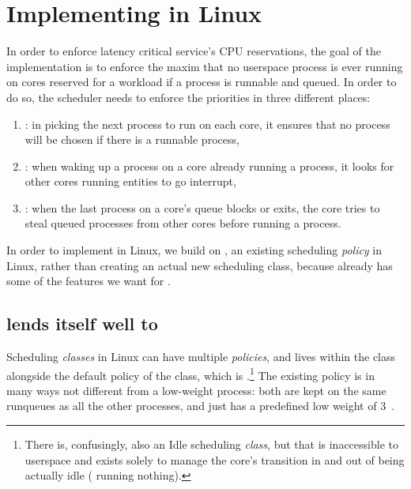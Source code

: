 \section{Implementing \beclass{} in Linux}\label{s:implementation}

In order to enforce latency critical service's CPU reservations, the goal of the
implementation is to enforce the maxim that no \beclass{} userspace process is
ever running on cores reserved for a \normalclass{} workload if a \normalclass{}
process is runnable and queued. In order to do so, the scheduler needs to
enforce the priorities in three different places:
\begin{enumerate}
    \item \local: in picking the next process to run on each core, it ensures
        that no \beclass{} process will be chosen if there is a runnable
        \normalclass{} process,
    \item \entry: when waking up a \normalclass{} process on a core already
        running a \normalclass{} process, it looks for other cores running
        \beclass{} entities to go interrupt,
    \item \exit: when the last \normalclass{} process on a core's queue blocks
        or exits, the core tries to steal queued \normalclass{} processes from
        other cores before running a \beclass{} process.
\end{enumerate}

In order to implement \beclass{} in Linux, we build on \schedidle{}, an existing
scheduling \textit{policy} in Linux, rather than creating an actual new
scheduling class, because \schedidle{} already has some of the features we want
for \beclass{}.

\subsection{\schedidle{} lends itself well to \beclass{}}

Scheduling \textit{classes} in Linux can have multiple \textit{policies}, and
\schedidle{} lives within the \normalclass{} class alongside the default policy
of the \normalclass{} class, which is \schednormal{}.\footnote{There is,
confusingly, also an Idle scheduling \textit{class}, but that is inaccessible to
userspace and exists solely to manage the core's transition in and out of being
actually idle (\ie{} running nothing).} The existing \schedidle{} policy is in many
ways not different from a low-weight \schednormal{} process: both are kept on
the same runqueues as all the other \schednormal{} processes, and \schedidle{}
just has a predefined low weight of 3~\cite{weight-idleprio}.

